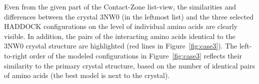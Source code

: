 \documentclass{bmcart}
\def\CoZoListView {Contact-Zone list-view\xspace}
\begin{document}
Even from the given part of the \CoZoListView, the similarities and differences between the crystal 3NW0 (in the leftmost list) and the three selected HADDOCK configurations on the level of individual amino acids are clearly visible.
In addition, the pairs of the interacting amino acids identical to the 3NW0 crystal structure are highlighted (red lines in Figure~\ref{fig:case3}). 
The left-to-right order of the modeled configurations in Figure~\ref{fig:case3} reflects their similarity to the primary crystal structure, based on the number of identical pairs of amino acids (the best model is next to the crystal).



\end{document}
